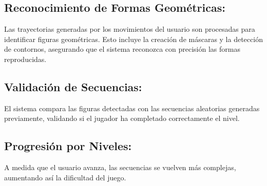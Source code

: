 \subsection{Reconocimiento de Formas Geométricas:}
Las trayectorias generadas por los movimientos del usuario son procesadas para identificar figuras geométricas. Esto incluye la creación de máscaras y la detección de contornos, asegurando que el sistema reconozca con precisión las formas reproducidas.

\subsection{Validación de Secuencias:}
El sistema compara las figuras detectadas con las secuencias aleatorias generadas previamente, validando si el jugador ha completado correctamente el nivel.

\subsection{Progresión por Niveles:}
A medida que el usuario avanza, las secuencias se vuelven más complejas, aumentando así la dificultad del juego.
